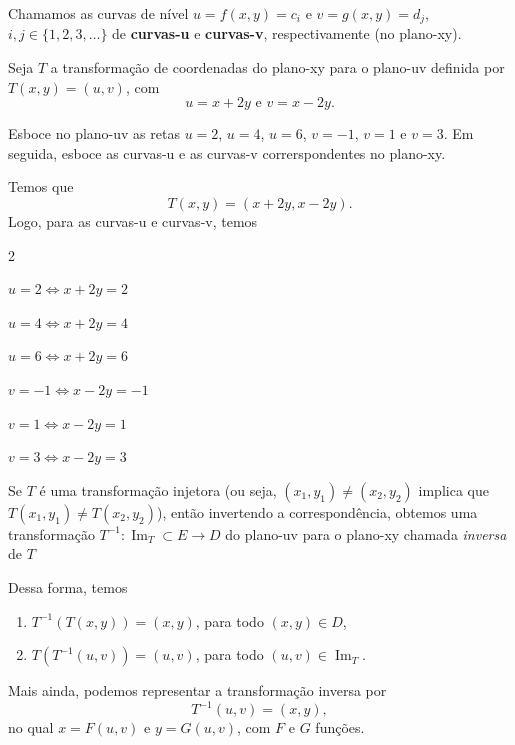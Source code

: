 \begin{definition}
    Chamamos as curvas de nível \(u = f(x,y) = c_i\) e \(v = g(x,y) = d_j\), \(i,j\in\{1,2,3,\dots\}\) de \textbf{curvas-u} e \textbf{curvas-v}, respectivamente (no plano-xy).
\end{definition}

\begin{example}\label{ex.MudancaCoordenadas}
    Seja \(T\) a transformação de coordenadas do plano-xy para o plano-uv definida por \(T(x,y) = (u,v)\), com \[u = x+2y \text{ e } v = x-2y.\]

    Esboce no plano-uv as retas \(u=2\), \(u=4\), \(u=6\), \(v = -1\), \(v=1\) e \(v=3\). Em seguida, esboce as curvas-u e as curvas-v correrspondentes no plano-xy.

    Temos que \[T(x,y) = (x+2y,x-2y).\] Logo, para as curvas-u e curvas-v, temos
        \begin{multicols}{2}
            \begin{center}
                \(u = 2 \Leftrightarrow x + 2y = 2\)

                \(u = 4 \Leftrightarrow x + 2y = 4\)

                \(u = 6 \Leftrightarrow x + 2y = 6\)
            \end{center}
            \newcolumn
            \begin{center}
                \(v = -1 \Leftrightarrow x - 2y = -1\)

                \(v = 1 \Leftrightarrow x - 2y = 1\)

                \(v = 3 \Leftrightarrow x - 2y = 3\)
            \end{center}
        \end{multicols}
\end{example}

\begin{remark}
    Se \(T\) é uma transformação injetora (ou seja, \((x_1,y_1)\neq(x_2,y_2)\) implica que \(T(x_1,y_1)\neq T(x_2,y_2)\)), então invertendo a correspondência, obtemos uma transformação \(T^{-1}: \operatorname{Im}_T \subset E \to D\) do plano-uv para o plano-xy chamada \textit{inversa} de \(T\)
\end{remark}

Dessa forma, temos
    \begin{enumerate}
        \item \(T^{-1}(T(x,y)) = (x,y)\), para todo \((x,y)\in D\),
        \item \(T(T^{-1}(u,v)) = (u,v)\), para todo \((u,v)\in\operatorname{Im}_T.\)
    \end{enumerate}
Mais ainda, podemos representar a transformação inversa por \[T^{-1}(u,v) = (x,y),\] no qual \(x = F(u,v)\) e \(y = G(u,v)\), com \(F\) e \(G\) funções.

